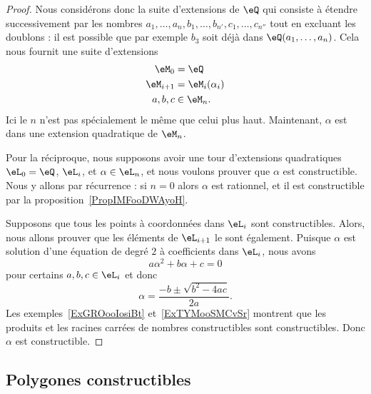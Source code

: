\begin{proof}
	Nous considérons donc la suite d'extensions de \( \eQ\) qui consiste à étendre successivement par les nombres \( a_1,\ldots, a_n,b_1,\ldots, b_{n'},c_1,\ldots, c_{n''}\) tout en excluant les doublons : il est possible que par exemple \( b_3\) soit déjà dans \( \eQ(a_1,\ldots, a_n)\). Cela nous fournit une suite d'extensions
	\begin{equation}
		\begin{aligned}[]
			\eM_0     & =\eQ             \\
			\eM_{i+1} & =\eM_i(\alpha_i) \\
			a,b,c     & \in \eM_n.
		\end{aligned}
	\end{equation}
	Ici le \( n\) n'est pas spécialement le même que celui plus haut. Maintenant, \( \alpha\) est dans une extension quadratique de \( \eM_n\).

	Pour la réciproque, nous supposons avoir une tour d'extensions quadratiques \( \eL_0=\eQ\), \( \eL_i\), et \( \alpha\in \eL_n\), et nous voulons prouver que \( \alpha\) est constructible. Nous y allons par récurrence : si \( n=0\) alors \( \alpha\) est rationnel, et il est constructible par la proposition~\ref{PropIMFooDWAyoH}.

	Supposons que tous les points à coordonnées dans \( \eL_i\) sont constructibles. Alors, nous allons prouver que les éléments de \( \eL_{i+1}\) le sont également. Puisque \( \alpha\) est solution d'une équation de degré \( 2\) à coefficients dans \( \eL_i\), nous avons
	\begin{equation}
		a\alpha^2+b\alpha+c=0
	\end{equation}
	pour certains \( a,b,c\in\eL_i\) et donc
	\begin{equation}
		\alpha=\frac{-b\pm\sqrt{b^2-4ac} }{ 2a }.
	\end{equation}
	Les exemples~\ref{ExGROooIosiBt} et~\ref{ExTYMooSMCvSr} montrent que les produits et les racines carrées de nombres constructibles sont constructibles. Donc \( \alpha\) est constructible.
\end{proof}

\subsection{Polygones constructibles}

